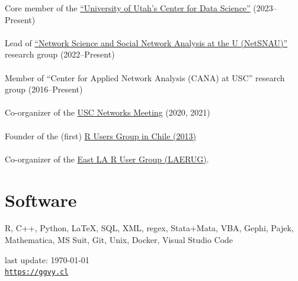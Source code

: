 \documentclass[letterpaper, 10pt]{article}
\def\footerlink{https://ggvy.cl}
\renewcommand{\textbf}[1]{{\bfseries\color{teal}#1}}
\begin{document}
\noindent Core member of the \href{https://datascience.utah.edu}{``University of Utah's Center for Data Science''} (2023--Present)\\\\
%
Lead of \href{https://netsci.utah.edu}{``Network Science and Social Network Analysis at the U (NetSNAU)''} research group (2022--Present)\\\\
%
Member of ``Center for Applied Network Analysis (CANA) at USC'' research group (2016--Present) \\\\
%
Co-organizer of the \href{https://networkanalysis.usc.edu}{USC Networks Meeting} (2020, 2021)\\\\
%
Founder of the (first) \href{https://www.meetup.com/useRchile/}{R Users Group in Chile (2013)}\\\\
%
Co-organizer of the \href{https://socalr.org}{East LA R User Group (LAERUG)}.

\section*{Software}

R, C++, Python, \LaTeX, SQL, XML, regex, Stata+Mata, VBA, Gephi, Pajek, Mathematica, MS Suit, Git, Unix, Docker, Visual Studio Code

\bigskip

\begin{center}
 \begin{footnotesize}
   last update: \today \\
   \href{\footerlink}{\texttt{\footerlink}}
 \end{footnotesize}
\end{center}
\end{document}
